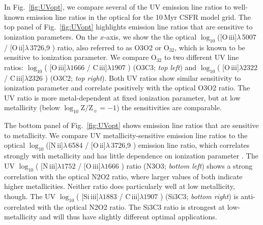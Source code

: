 \documentclass[preprint2,trackchanges]{aastex62}
\newcommand{\nii}{[N\,{\sc ii}]\xspace}
\newcommand{\niii}{[N\,{\sc iii}]\xspace}
\newcommand{\oiii}{[O\,{\sc iii}]\xspace}
\newcommand{\oii}{[O\,{\sc ii}]\xspace}
\newcommand{\SiuIII}{[Si\,{\sc iii}]\xspace}
\newcommand{\ciii}{C\,{\sc iii}]\xspace}
\newcommand{\Myr}{$\,$Myr\xspace}
\newcommand{\logten}{\ensuremath{\log_{10}}}
\newcommand{\logZeq}[1]{\ensuremath{\logten \mathrm{Z}/\mathrm{Z}_{\sun} = #1}}
\begin{document}
In Fig.~\ref{fig:UVopt}, we compare several of the UV emission line ratios to well-known emission line ratios in the optical for the 10\Myr CSFR model grid. The top panel of Fig.~\ref{fig:UVopt} highlights emission line ratios that are sensitive to ionization parameters. On the $x$-axis, we show the the optical $\log_{10}$(\oiii$\lambda\,$5007 / \oii$\lambda\,$3726,9 ) ratio, also referred to as O3O2 or O$_{32}$, which is known to be sensitive to ionization parameter. We compare O$_{32}$ to two different UV line ratios: $\log_{10}$( \oiii$\lambda1666$ / \ciii$\lambda1907$ ) (O3C3; \emph{top left}) and $\log_{10}$( \oiii$\lambda2322$ / \ciii$\lambda2326$ ) (O3C2; \emph{top right}). Both UV ratios show similar sensitivity to ionization parameter and correlate positively with the optical O3O2 ratio. The UV ratio is more metal-dependent at fixed ionization parameter, but at low metallicity (below \logZeq{-1}) the sensitivities are comparable.

The bottom panel of Fig.~\ref{fig:UVopt} shows emission line ratios that are sensitive to metallicity. We compare UV metallicity-sensitive emission line ratios to the optical $\log_{10}$(\nii$\lambda\,$6584 / \oii$\lambda\,$3726,9 ) emission line ratio, which correlates strongly with metallicity and has little dependence on ionization parameter \citep{Kewley+2002}. The UV $\log_{10}$( \niii$\lambda1752$ / \oiii$\lambda1666$ ) ratio (N3O3; \emph{bottom left}) shows a strong correlation with the optical N2O2 ratio, where larger values of both indicate higher metallicities. Neither ratio does particularly well at low metallicity, though. The UV $\log_{10}$( \SiuIII$\lambda1883$ / \ciii$\lambda1907$ ) (Si3C3; \emph{bottom right}) is anti-correlated with the optical N2O2 ratio. The Si3C3 ratio is strongest at low-metallicity and will thus have slightly different optimal applications.
\end{document}
